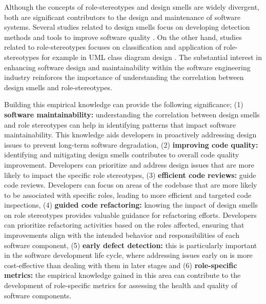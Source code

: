 \documentclass[AMA,Times1COL]{WileyNJDv5} %
\begin{document}
Although the concepts of role-stereotypes and design smells are widely divergent, both are significant contributors to the design and maintenance of software systems. Several studies related to design smells focus on developing detection methods and tools to improve software quality \cite{barbez2020machine,kaur2018detecting, liu2018deep}. On the other hand, studies related to role-stereotypes focuses on classification \cite{dragan2010automatic,nurwidyantoro2019automated} and application of role-stereotypes for example in UML class diagram design \cite{kuzniarz2004empirical}. The substantial interest in enhancing software design and maintainability within the software engineering industry reinforces the importance of understanding the correlation between design smells and role-stereotypes.

 Building this empirical knowledge can provide the following significance; (1) \textbf{software maintainability:} understanding the correlation between design smells and role stereotypes can help in identifying patterns that impact software maintainability. This knowledge aids developers in proactively addressing design issues to prevent long-term software degradation, (2) \textbf{improving code quality:} identifying and mitigating design smells contributes to overall code quality improvement. Developers can prioritize and address design issues that are more likely to impact the specific role stereotypes, (3) \textbf{efficient code reviews:} guide code reviews. Developers can focus on areas of the codebase that are more likely to be associated with specific roles, leading to more efficient and targeted code inspections, (4) \textbf{guided code refactoring:} knowing the impact of design smells on role stereotypes provides valuable guidance for refactoring efforts. Developers can prioritize refactoring activities based on the roles affected, ensuring that improvements align with the intended behavior and responsibilities of each software component, (5) \textbf{early  defect detection:} this is particularly important in the software development life cycle, where addressing issues early on is more cost-effective than dealing with them in later stages and (6) \textbf{role-specific metrics:} the empirical knowledge gained in this area can contribute to the development of role-specific metrics for assessing the health and quality of software components.
\end{document}
